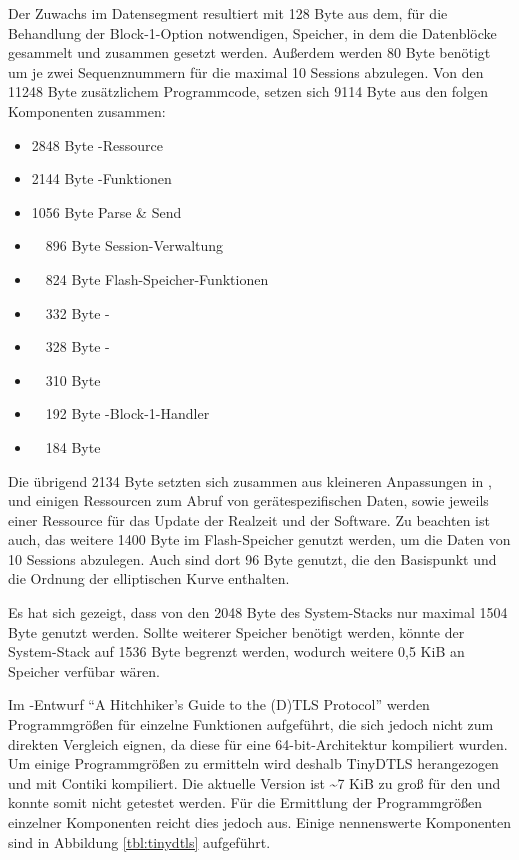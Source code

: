 Der Zuwachs im Datensegment resultiert mit 128 Byte aus dem, für die Behandlung der Block-1-Option notwendigen, Speicher, in dem die Datenblöcke gesammelt und
zusammen gesetzt werden. Außerdem werden 80 Byte benötigt um je zwei Sequenznummern für die maximal 10 Sessions abzulegen. Von den 11248 Byte zusätzlichem
Programmcode, setzen sich 9114 Byte aus den folgen Komponenten zusammen:
\begin{itemize}
  \item  2848 Byte -Ressource
  \item  2144 Byte -Funktionen
  \item  1056 Byte Parse \& Send
  \item ~~896 Byte Session-Verwaltung
  \item ~~824 Byte Flash-Speicher-Funktionen
  \item ~~332 Byte -
  \item ~~328 Byte -
  \item ~~310 Byte 
  \item ~~192 Byte -Block-1-Handler
  \item ~~184 Byte 
\end{itemize}
Die übrigend 2134 Byte setzten sich zusammen aus kleineren Anpassungen in , und einigen Ressourcen zum Abruf von gerätespezifischen Daten,
sowie jeweils einer Ressource für das Update der Realzeit und der Software. Zu beachten ist auch, das weitere 1400 Byte im Flash-Speicher genutzt werden,
um die Daten von 10 Sessions abzulegen. Auch sind dort 96 Byte genutzt, die den Basispunkt und die Ordnung der elliptischen Kurve enthalten.

Es hat sich gezeigt, dass von den 2048 Byte des System-Stacks nur maximal 1504 Byte genutzt werden. Sollte weiterer Speicher benötigt werden, könnte
der System-Stack auf 1536 Byte begrenzt werden, wodurch weitere 0,5 KiB an Speicher verfübar wären.

Im -Entwurf "`A Hitchhiker's Guide to the (D)TLS Protocol"' \cite{draftmintls} werden Programmgrößen für einzelne
Funktionen aufgeführt, die sich jedoch nicht zum direkten Vergleich eignen, da diese für eine 64-bit-Architektur kompiliert wurden.
Um einige Programmgrößen zu ermitteln wird deshalb TinyDTLS \cite{tinydtls} herangezogen und mit Contiki kompiliert.
Die aktuelle Version ist \textasciitilde 7 KiB zu groß für den  und konnte somit nicht getestet werden. Für die Ermittlung
der Programmgrößen einzelner Komponenten reicht dies jedoch aus. Einige nennenswerte Komponenten sind in Abbildung \ref{tbl:tinydtls} aufgeführt.

